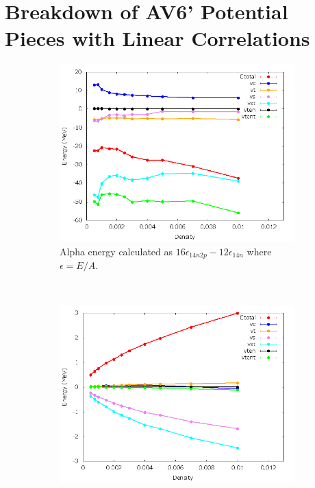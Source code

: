 \documentclass[12pt]{article}
\begin{document}
\section{Breakdown of AV6' Potential Pieces with Linear Correlations}
\begin{figure}[h!]
   \centering
   \begin{subfigure}{0.49\textwidth}
      \includegraphics[width=\textwidth]{../av6_alpha_lin.png}
      \caption{Alpha energy calculated as $16\epsilon_{14n2p}-12\epsilon_{14n}$ where $\epsilon=E/A$.}
   \end{subfigure}
   ~
   \begin{subfigure}{0.49\textwidth}
      \includegraphics[width=\textwidth]{../av6_14n_lin.png}

\end{subfigure}
\end{figure}
\end{document}
